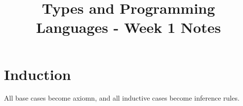 \documentclass[11pt]{article}
\title{Types and Programming Languages - Week 1 Notes}
\author{}
\date{}
\begin{document}
\maketitle

\section{Induction}
All base cases become axiomn, and all inductive cases become inference rules.
\end{document}
